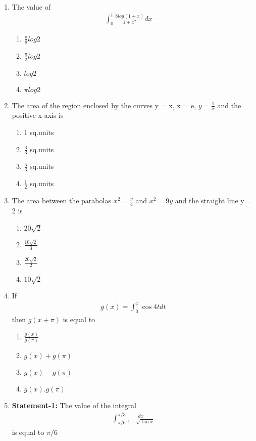 \begin{enumerate}[label=\arabic*.,ref=\thesubsection.\theenumi]
\item The value of
\begin{align*}
\int_{0}^{1}\frac{8log(1 + x)}{1 + x^2}dx = 
\end{align*}
\begin{enumerate}
\item $\frac{\pi}{8}log2$
\item $\frac{\pi}{2}log2$
\item $log2$
\item $\pi log2$
\end{enumerate}

\item The area of the region enclosed by the curves y = x, x = e, $y = \frac{1}{x}$ and the positive x-axis is
\begin{enumerate}
\item 1 sq.units
\item $\frac{3}{3}$ sq.units
\item $\frac{5}{3}$ sq.units
\item $\frac{1}{2}$ sq.units
\end{enumerate}

\item The area between the parabolas $x^2 = \frac{y}{4}$ and $x^2 = 9y$ and the straight line y = 2 is
\begin{enumerate}
\item $20\sqrt{2}$
\item $\frac{10\sqrt{2}}{3}$
\item $\frac{20\sqrt{2}}{2}$
\item $10\sqrt{2}$
\end{enumerate}

\item If 
\begin{align*}
g(x)  = \int_{0}^{x}\cos 4t dt
\end{align*}
then $g(x + \pi)$ is equal to
\begin{enumerate}
\item $\frac{g(x)}{g(\pi)}$
\item $g(x) + g(\pi)$
\item $g(x) - g(\pi)$
\item $g(x).g(\pi)$
\end{enumerate}

\item 
\textbf{Statement-1:} The value of the integral
\begin{align*}
\int_{\pi/6}^{\pi/3}\frac{dx}{1 + \sqrt{\tan x}}
\end{align*}
is equal to $\pi/6$


\end{enumerate}
